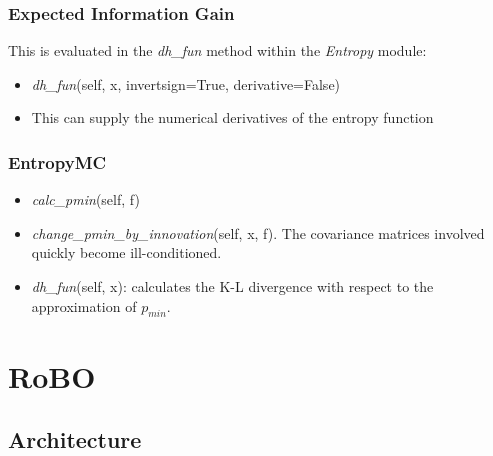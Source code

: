 \documentclass[10pt,handout]{beamer}
\begin{document}
\begin{frame}
\frametitle{Expected Information Gain}

This is evaluated in the \emph{dh\_fun} method within the \emph{Entropy} module:

\begin{itemize}
  \item \emph{dh\_fun}(self, x, invertsign=True, derivative=False)
  \item This can supply the numerical derivatives of the entropy function

\end{itemize}


\end{frame}



\begin{frame}
\frametitle{EntropyMC}

\begin{itemize}
  \item \emph{calc\_pmin}(self, f)
  \item \emph{change\_pmin\_by\_innovation}(self, x, f). The covariance matrices
  involved quickly become ill-conditioned.
  \item \emph{dh\_fun}(self, x): calculates the K-L divergence with respect to
  the approximation of $p_{min}$.
\end{itemize}

\end{frame}


\section{RoBO}

\subsection{Architecture}
\end{document}

